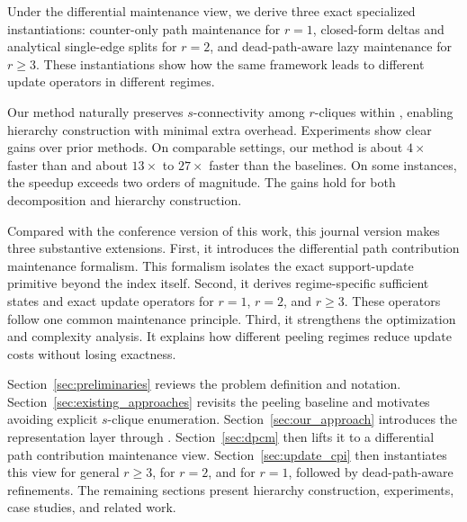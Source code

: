 %
Under the differential maintenance view, we derive three exact specialized instantiations:
counter-only path maintenance for $r{=}1$,
closed-form deltas and analytical single-edge splits for $r{=}2$,
and dead-path-aware lazy maintenance for $r{\ge}3$.
%
These instantiations show how the same framework leads to different update operators in different regimes.

%
Our method naturally preserves $s$-connectivity among $r$-cliques within \cpi, enabling hierarchy construction with minimal extra overhead.
%
Experiments show clear gains over prior methods.
%
On comparable settings, our method is about $4\times$ faster than \arb and about $13\times$ to $27\times$ faster than the \nucleus baselines.
%
On some instances, the speedup exceeds two orders of magnitude.
%
The gains hold for both decomposition and hierarchy construction.

%
Compared with the conference version of this work, this journal version makes three substantive extensions.
%
First, it introduces the differential path contribution maintenance formalism.
%
This formalism isolates the exact support-update primitive beyond the index itself.
%
Second, it derives regime-specific sufficient states and exact update operators for $r{=}1$, $r{=}2$, and $r{\ge}3$.
%
These operators follow one common maintenance principle.
%
Third, it strengthens the optimization and complexity analysis.
%
It explains how different peeling regimes reduce update costs without losing exactness.

%
Section~\ref{sec:preliminaries} reviews the problem definition and notation.
%
Section~\ref{sec:existing_approaches} revisits the peeling baseline and motivates avoiding explicit $s$-clique enumeration.
%
Section~\ref{sec:our_approach} introduces the representation layer through \cpi.
%
Section~\ref{sec:dpcm} then lifts it to a differential path contribution maintenance view.
%
Section~\ref{sec:update_cpi} then instantiates this view for general $r{\ge}3$, for $r{=}2$, and for $r{=}1$, followed by dead-path-aware refinements.
%
The remaining sections present hierarchy construction, experiments, case studies, and related work.


% 

